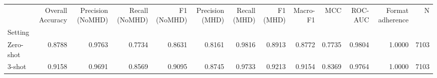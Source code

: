 \begin{tabular}{lrrrrrrrrrrrr}
\toprule
 & Overall Accuracy & Precision (NoMHD) & Recall (NoMHD) & F1 (NoMHD) & Precision (MHD) & Recall (MHD) & F1 (MHD) & Macro-F1 & MCC & ROC-AUC & Format adherence & N \\
Setting &  &  &  &  &  &  &  &  &  &  &  &  \\
\midrule
Zero-shot & 0.8788 & 0.9763 & 0.7734 & 0.8631 & 0.8161 & 0.9816 & 0.8913 & 0.8772 & 0.7735 & 0.9804 & 1.0000 & 7103 \\
3-shot & 0.9158 & 0.9691 & 0.8569 & 0.9095 & 0.8745 & 0.9733 & 0.9213 & 0.9154 & 0.8369 & 0.9764 & 1.0000 & 7103 \\
\bottomrule
\end{tabular}
